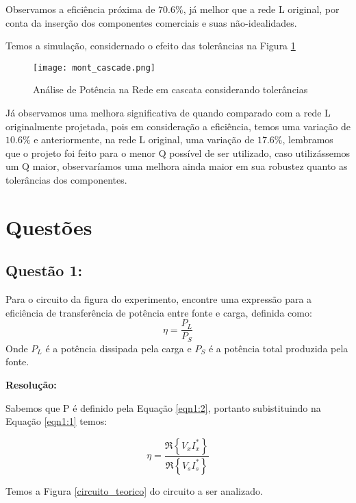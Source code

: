 \documentclass[a4paper,12pt]{proc}
\begin{document}
\noindent Observamos a eficiência próxima de $70.6\%$, já melhor que a rede L original, por conta da inserção dos componentes comerciais e suas não-idealidades.

\singlespacing

\noindent Temos a simulação, considernado o efeito das tolerâncias na Figura \ref{mont_cascade}

\begin{figure}[htbp]
    \centering
    \texttt{[image: mont\_cascade.png]}
    \caption{Análise de Potência na Rede em cascata considerando tolerâncias}
    \label{mont_cascade}
\end{figure}

\noindent Já observamos uma melhora significativa de quando comparado com a rede L originalmente projetada, pois em consideração a eficiência, temos uma variação de $10.6\%$ e anteriormente, na rede L original, uma variação de $17.6\%$, lembramos que o projeto foi feito para o menor Q possível de ser utilizado, caso utilizássemos um Q maior, observaríamos uma melhora ainda maior em sua robustez quanto as tolerâncias dos componentes.

\section{Questões}

\subsection{Questão 1:}

Para o circuito da figura do experimento, encontre uma expressão para a eficiência de transferência de potência entre fonte
e carga, definida como: 
\[\eta = \frac{P_{L}}{P_{S}}\]
Onde $P_{L}$ é a potência dissipada pela carga e $P_{S}$ é a potência total produzida pela fonte.

\singlespacing

\textbf{Resolução:}

\noindent Sabemos que P é definido pela Equação \ref{eqn1:2}, portanto subistituindo na Equação \ref{eqn1:1} temos:

\begin{equation}
    \eta = \frac{\Re \left \{ V_{x}I_{x}^{\ast } \right \}}{\Re \left \{ V_{s}I_{s}^{\ast } \right \}}
    \label{eqn6}
\end{equation}

\noindent Temos a Figura \ref{circuito_teorico} do circuito a ser analizado.
\end{document}
